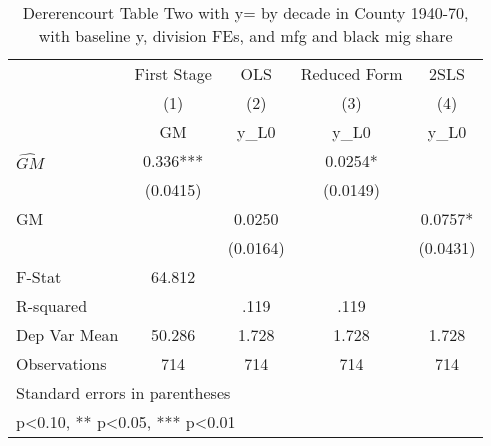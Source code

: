 \begin{table}[htbp]\centering
\def\sym#1{\ifmmode^{#1}\else\(^{#1}\)\fi}
\caption{Dererencourt Table Two with y= by decade in County 1940-70, with baseline y, division FEs, and mfg and black mig share}
\begin{tabular}{l*{4}{c}}
\toprule
                    & First Stage   &         OLS   &Reduced Form   &        2SLS   \\
                    &\multicolumn{1}{c}{(1)}&\multicolumn{1}{c}{(2)}&\multicolumn{1}{c}{(3)}&\multicolumn{1}{c}{(4)}\\
                    &\multicolumn{1}{c}{GM}&\multicolumn{1}{c}{y\_L0}&\multicolumn{1}{c}{y\_L0}&\multicolumn{1}{c}{y\_L0}\\
\midrule
$\hat{GM}$          &       0.336***&               &      0.0254*  &               \\
                    &    (0.0415)   &               &    (0.0149)   &               \\
\addlinespace
GM                  &               &      0.0250   &               &      0.0757*  \\
                    &               &    (0.0164)   &               &    (0.0431)   \\
\midrule
F-Stat              &      64.812   &               &               &               \\
R-squared           &               &        .119   &        .119   &               \\
Dep Var Mean        &      50.286   &       1.728   &       1.728   &       1.728   \\
Observations        &         714   &         714   &         714   &         714   \\
\bottomrule
\multicolumn{5}{l}{\footnotesize Standard errors in parentheses}\\
\multicolumn{5}{l}{\footnotesize * p<0.10, ** p<0.05, *** p<0.01}\\
\end{tabular}
\end{table}
